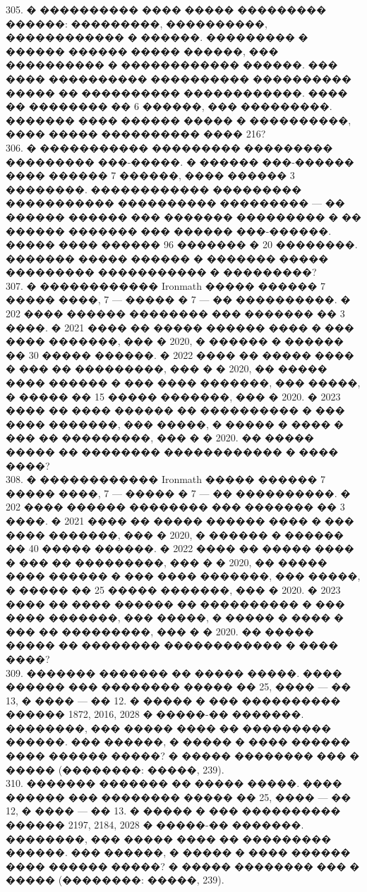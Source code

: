 \documentclass[12pt]{article}
\begin{document}
305. � ���������� ���� ����� ��������� ������: ���������, ����������, ������������ � ������. ��������� � ������ ������ ����� ������, ��� ���������� � ������������ ������. ��� ���� ���������� ���������� ���������� ����� �� ���������� ������������. ���� �� �������� �� 6 ������, ��� ���������. ������� ���� ������ ����� � ����������, ���� ����� ���������� ���� 216?\\
306. � ����������� ��������� ��������� ��������� ���-�����. � ������ ���-������ ���� ������ 7 ������, ���� ������ 3 ��������. ������������ ��������� ����������� ���������� ��������� --- �� ������ ������ ��� ������� ��������� � �� ������ ������� ��� ������ ���-������. ����� ���� ������ 96 ������� � 20 ��������. ������� ����� ������ � ������� ����� ��������� ����������� � ���������?\\
307. � ������������ Ironmath ����� ������ 7 ����� ����, 7 --- ����� � 7 --- �� ����������. � 202 ���� ������ �������� ��� ������� �� 3 ����. � 2021 ���� �� ����� ������ ���� � ��� ���� �������, ��� � 2020, � ������ � ������ �� 30 ����� ������. � 2022 ���� �� ����� ���� � ��� �� ���������, ��� � � 2020, �� ����� ���� ������ � ��� ���� �������, ��� �����, � ����� �� 15 ����� �������, ��� � 2020. � 2023 ���� �� ���� ������ �� ���������� � ��� ���� �������, ��� �����, � ����� � ���� � ��� �� ���������, ��� � � 2020. �� ����� ����� �� �������� ������������ � ���� ����?\\
308. � ������������ Ironmath ����� ������ 7 ����� ����, 7 --- ����� � 7 --- �� ����������. � 202 ���� ������ �������� ��� ������� �� 3 ����. � 2021 ���� �� ����� ������ ���� � ��� ���� �������, ��� � 2020, � ������ � ������ �� 40 ����� ������. � 2022 ���� �� ����� ���� � ��� �� ���������, ��� � � 2020, �� ����� ���� ������ � ��� ���� �������, ��� �����, � ����� �� 25 ����� �������, ��� � 2020. � 2023 ���� �� ���� ������ �� ���������� � ��� ���� �������, ��� �����, � ����� � ���� � ��� �� ���������, ��� � � 2020. �� ����� ����� �� �������� ������������ � ���� ����?\\
309. ������� ������� �� ����� �����. ���� ������ ��� �������� ����� �� 25, ���� --- �� 13, � ���� --- �� 12. � ����� � ��� ���������� ������ 1872, 2016, 2028 � �����-�� �������. ��������, ��� ����� ���� �� ��������� ������. ��� ������, � ����� � ���� ������ ���� ������ �����? � ����� �������� ��� � ����� (��������: �����, 239).\\
310. ������� ������� �� ����� �����. ���� ������ ��� �������� ����� �� 25, ���� --- �� 12, � ���� --- �� 13. � ����� � ��� ���������� ������ 2197, 2184, 2028 � �����-�� �������. ��������, ��� ����� ���� �� ��������� ������. ��� ������, � ����� � ���� ������ ���� ������ �����? � ����� �������� ��� � ����� (��������: �����, 239).\\
\end{document}
